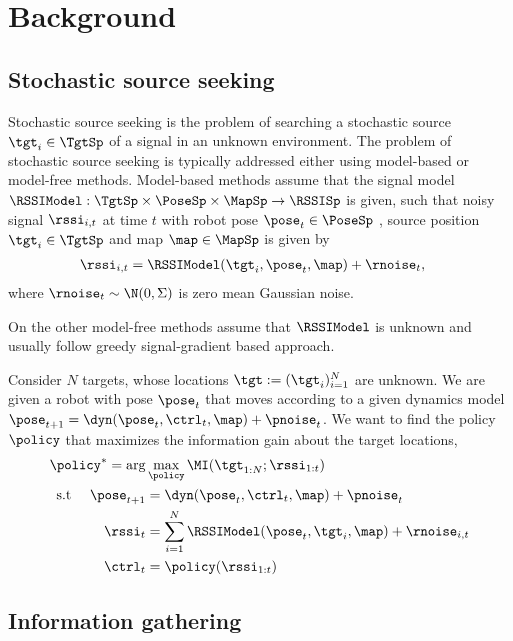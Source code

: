 \section{Background}

\subsection{Stochastic source seeking}
Stochastic source seeking is the problem of searching  a stochastic source
$\tgt_i \in \TgtSp$ of a signal in an unknown environment.
The problem of stochastic source seeking is typically addressed either using
model-based or model-free methods.
Model-based methods assume that the signal model
$\RSSIModel: \TgtSp \times \PoseSp \times \MapSp \rightarrow \RSSISp$
is given, such that noisy signal $\rssi_{i,t}$ at time $t$ with robot pose
$\pose_t \in \PoseSp$ , source position $\tgt_i \in \TgtSp$ and map $\map \in
\MapSp$ is given by
%
\begin{align}
\rssi_{i,t} &= \RSSIModel(\tgt_i, \pose_t, \map) + \rnoise_t,
\end{align}%
% 
where $\rnoise_t \sim  \N(0, \Sigma)$ is zero mean Gaussian noise.

On the other model-free methods assume that $\RSSIModel$ is unknown and usually
follow greedy signal-gradient based approach.

\begin{problem}
Consider $N$ targets, whose locations $\mathbf{\tgt} := (\tgt_i)_{i=1}^N$ are unknown. We are given
a robot with pose $\pose_t$ that moves according to a given dynamics model
$\pose_{t+1} = \dyn(\pose_t, \ctrl_t, \map) + \pnoise_t$. We want to find the
policy $\policy$ that maximizes the information gain about the target locations,
%
\begin{equation}\begin{split}
    \policy^* = \arg&\max_{\policy} \MI( \mathbf{\tgt}_{1:N} ; \rssi_{1:t} )
  \\
  \text{s.t } \quad
  \pose_{t+1} &= \dyn(\pose_t, \ctrl_t, \map) + \pnoise_t
  \\
  \rssi_{t} &= \sum_{i=1}^N \RSSIModel(\pose_t, \tgt_i, \map) + \rnoise_{i,t}
  \\
  \ctrl_t &= \policy(\rssi_{1:t})
\end{split}\end{equation}
%
\end{problem}


\subsection{Information gathering}

